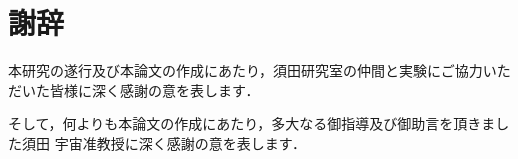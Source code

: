 \newpage
\section*{謝辞}

本研究の遂行及び本論文の作成にあたり，須田研究室の仲間と実験にご協力いただいた皆様に深く感謝の意を表します．

そして，何よりも本論文の作成にあたり，多大なる御指導及び御助言を頂きました須田 宇宙准教授に深く感謝の意を表します．
